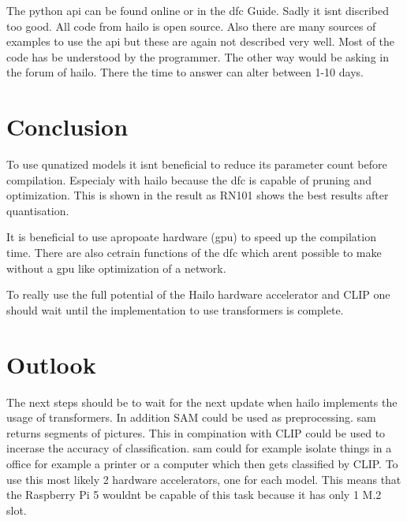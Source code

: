 The python \acrfull{api} can be found online or in the \acrshort{dfc} Guide.
Sadly it isnt discribed too good.
All code from hailo is open source.
Also there are many sources of examples to use the \acrshort{api} but these are again not described very well.
Most of the code has be understood by the programmer.
The other way would be asking in the forum of hailo.
There the time to answer can alter between 1-10 days.



\section{Conclusion}

To use qunatized models it isnt beneficial to reduce its parameter count before compilation.
Especialy with hailo because the \acrshort{dfc} is capable of pruning and optimization.
This is shown in the result as RN101 shows the best results after quantisation.

It is beneficial to use apropoate hardware (\acrshort{gpu}) to speed up the compilation time.
There are also cetrain functions of the \acrshort{dfc} which arent possible to make without a \acrshort{gpu} like optimization of a network.

To really use the full potential of the Hailo hardware accelerator and CLIP one should wait until the implementation to use transformers is complete. 

\section{Outlook}

The next steps should be to wait for the next update when hailo implements the usage of transformers.
In addition SAM\cite{sam} could be used as preprocessing.
\acrshort{sam} returns segments of pictures.
This in compination with CLIP could be used to incerase the accuracy of classification.
\acrshort{sam} could for example isolate things in a office for example a printer or a computer which then gets classified by CLIP.
To use this most likely 2 hardware accelerators, one for each model.
This means that the Raspberry Pi 5 wouldnt be capable of this task because it has only 1 M.2 slot.

